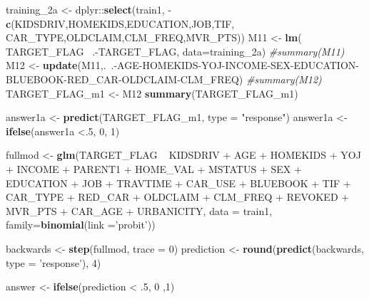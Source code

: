 \documentclass[]{article}
\newenvironment{Shaded}{\begin{snugshade}}{\end{snugshade}}
\newcommand{\KeywordTok}[1]{\textcolor[rgb]{0.13,0.29,0.53}{\textbf{{#1}}}}
\newcommand{\DataTypeTok}[1]{\textcolor[rgb]{0.13,0.29,0.53}{{#1}}}
\newcommand{\DecValTok}[1]{\textcolor[rgb]{0.00,0.00,0.81}{{#1}}}
\newcommand{\StringTok}[1]{\textcolor[rgb]{0.31,0.60,0.02}{{#1}}}
\newcommand{\CommentTok}[1]{\textcolor[rgb]{0.56,0.35,0.01}{\textit{{#1}}}}
\newcommand{\NormalTok}[1]{{#1}}
\begin{document}
\begin{Shaded}
\begin{Highlighting}[]
{{{{\NormalTok{training_2a <-}\StringTok{ }\NormalTok{dplyr::}\KeywordTok{select}\NormalTok{(train1, -}\KeywordTok{c}\NormalTok{(KIDSDRIV,HOMEKIDS,EDUCATION,JOB,TIF,}
                                     \NormalTok{CAR_TYPE,OLDCLAIM,CLM_FREQ,MVR_PTS))}
\NormalTok{M11 <-}\StringTok{ }\KeywordTok{lm}\NormalTok{( TARGET_FLAG~}\StringTok{ }\NormalTok{.-TARGET_FLAG, }\DataTypeTok{data=}\NormalTok{training_2a)}
\CommentTok{#summary(M11)}
\NormalTok{M12 <-}\StringTok{ }\KeywordTok{update}\NormalTok{(M11,.~.-AGE-HOMEKIDS-YOJ-INCOME-SEX-EDUCATION-BLUEBOOK-RED_CAR-OLDCLAIM-CLM_FREQ)}
\CommentTok{#summary(M12)}
\NormalTok{TARGET_FLAG_m1 <-}\StringTok{ }\NormalTok{M12}
\KeywordTok{summary}\NormalTok{(TARGET_FLAG_m1)}

\NormalTok{answer1a <-}\StringTok{ }\KeywordTok{predict}\NormalTok{(TARGET_FLAG_m1, }\DataTypeTok{type =} \StringTok{"response"}\NormalTok{)}
\NormalTok{answer1a <-}\StringTok{ }\KeywordTok{ifelse}\NormalTok{(answer1a <.}\DecValTok{5}\NormalTok{, }\DecValTok{0}\NormalTok{, }\DecValTok{1}\NormalTok{)}

\NormalTok{fullmod <-}\StringTok{ }\KeywordTok{glm}\NormalTok{(TARGET_FLAG ~}\StringTok{ }\NormalTok{KIDSDRIV +}\StringTok{ }\NormalTok{AGE +}\StringTok{ }\NormalTok{HOMEKIDS +}\StringTok{ }\NormalTok{YOJ +}\StringTok{ }\NormalTok{INCOME +}\StringTok{ }\NormalTok{PARENT1 +}\StringTok{ }\NormalTok{HOME_VAL +}\StringTok{ }\NormalTok{MSTATUS +}\StringTok{ }\NormalTok{SEX +}\StringTok{ }\NormalTok{EDUCATION +}\StringTok{ }\NormalTok{JOB +}\StringTok{ }\NormalTok{TRAVTIME +}\StringTok{ }\NormalTok{CAR_USE +}\StringTok{ }\NormalTok{BLUEBOOK +}\StringTok{ }\NormalTok{TIF +}\StringTok{ }\NormalTok{CAR_TYPE +}\StringTok{ }\NormalTok{RED_CAR +}\StringTok{ }\NormalTok{OLDCLAIM +}\StringTok{ }\NormalTok{CLM_FREQ +}\StringTok{ }\NormalTok{REVOKED +}\StringTok{ }\NormalTok{MVR_PTS +}\StringTok{ }\NormalTok{CAR_AGE +}\StringTok{ }\NormalTok{URBANICITY, }\DataTypeTok{data =} \NormalTok{train1, }\DataTypeTok{family=}\KeywordTok{binomial}\NormalTok{(}\DataTypeTok{link =}\StringTok{'probit'}\NormalTok{))}

\NormalTok{backwards <-}\StringTok{ }\KeywordTok{step}\NormalTok{(fullmod, }\DataTypeTok{trace =} \DecValTok{0}\NormalTok{)}
\NormalTok{prediction <-}\StringTok{ }\KeywordTok{round}\NormalTok{(}\KeywordTok{predict}\NormalTok{(backwards, }\DataTypeTok{type =} \StringTok{'response'}\NormalTok{), }\DecValTok{4}\NormalTok{)}

\NormalTok{answer <-}\StringTok{ }\KeywordTok{ifelse}\NormalTok{(prediction <}\StringTok{ }\NormalTok{.}\DecValTok{5}\NormalTok{, }\DecValTok{0} \NormalTok{,}\DecValTok{1}\NormalTok{)}

}}}}
\end{Highlighting}
\end{Shaded}
\end{document}
